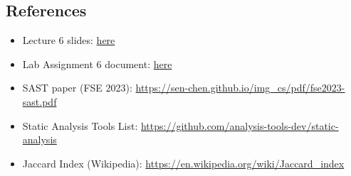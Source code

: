 



\subsection{References}
\begin{itemize}[itemsep=0em, topsep=0pt]
    \item Lecture 6 slides: \href{https://drive.google.com/file/d/1OMsoLPEgdlNIqyNxAHWlhF7YjaNRAywQ/view}{here}
    \item Lab Assignment 6 document: \href{https://drive.google.com/file/d/1kuFDbnKFp2hOZsSrbkbHoyNt9NNvcMux/view}{here}
    \item SAST paper (FSE 2023): \url{https://sen-chen.github.io/img_cs/pdf/fse2023-sast.pdf}
    \item Static Analysis Tools List: \url{https://github.com/analysis-tools-dev/static-analysis}
    \item Jaccard Index (Wikipedia): \url{https://en.wikipedia.org/wiki/Jaccard_index}
\end{itemize}
